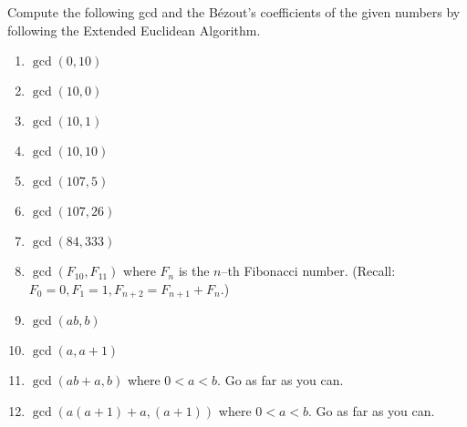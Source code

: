   Compute the following gcd and the B\'ezout's coefficients of the
  given numbers by following the Extended Euclidean Algorithm.
  \begin{enumerate}[nosep]
  \item $\gcd(0, 10)$
  \item $\gcd(10, 0)$
  \item $\gcd(10, 1)$
  \item $\gcd(10, 10)$
  \item $\gcd(107, 5)$
  \item $\gcd(107, 26)$
  \item $\gcd(84, 333)$
  \item $\gcd(F_{10}, F_{11})$ where $F_n$ is the $n$--th Fibonacci number.
    (Recall: $F_0 = 0, F_1 = 1, F_{n + 2} = F_{n + 1} + F_n$.)
  \item $\gcd(ab, b)$
  \item $\gcd(a, a + 1)$
  \item $\gcd(ab + a, b)$ where $0 < a < b$. Go as far as you can.
  \item $\gcd(a(a+1) + a, (a+1))$ where $0 < a < b$. Go as far as you can.
  \end{enumerate}
